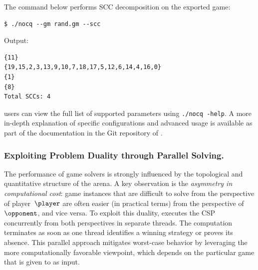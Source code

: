 \documentclass[runningheads]{llncs}
\begin{document}
\noindent The command below performs SCC decomposition on the exported game:
\begin{lstlisting}
$ ./nocq --gm rand.gm --scc
\end{lstlisting}

\noindent Output:
\begin{lstlisting}
{11}
{19,15,2,3,13,9,10,7,18,17,5,12,6,14,4,16,0}
{1}
{8}
Total SCCs: 4
\end{lstlisting}

\noindent \nocq users can view the full list of supported parameters using \texttt{./nocq -\-help}. A more in-depth explanation of specific configurations and advanced usage is available as part of the documentation in the Git repository of \nocq. 

\subsubsection{Exploiting Problem Duality through Parallel Solving.}

The performance of game solvers is strongly influenced by the topological and quantitative structure of the arena. A key observation is the \emph{asymmetry in computational cost}: game instances that are difficult to solve from the perspective of player~$\player$ are often easier (in practical terms) from the perspective of $\opponent$, and vice versa.
%
To exploit this duality, \nocq executes the CSP concurrently from both perspectives in separate threads. The computation terminates as soon as one thread identifies a winning strategy or proves its absence. This parallel approach mitigates worst-case behavior by leveraging the more computationally favorable viewpoint, which depends on the particular game that is given to \nocq as input. 



\end{document}
